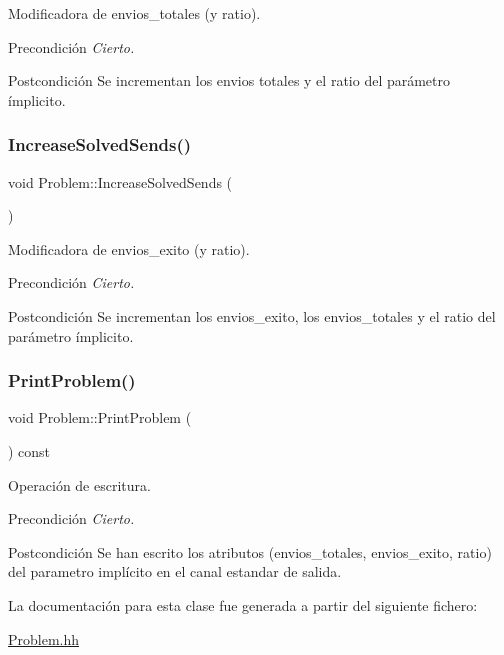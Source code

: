 Modificadora de envios\+\_\+totales (y ratio). 

\begin{DoxyPrecond}{Precondición}
{\itshape Cierto.} 
\end{DoxyPrecond}
\begin{DoxyPostcond}{Postcondición}
Se incrementan los envios totales y el ratio del parámetro ímplicito. 
\end{DoxyPostcond}
\mbox{\label{class_problem_ada706600dfd8d1f49096a23f8d22db33}} 
\subsubsection{\texorpdfstring{Increase\+Solved\+Sends()}{IncreaseSolvedSends()}}
{\footnotesize\ttfamily void Problem\+::\+Increase\+Solved\+Sends (\begin{DoxyParamCaption}{ }\end{DoxyParamCaption})}



Modificadora de envios\+\_\+exito (y ratio). 

\begin{DoxyPrecond}{Precondición}
{\itshape Cierto.} 
\end{DoxyPrecond}
\begin{DoxyPostcond}{Postcondición}
Se incrementan los envios\+\_\+exito, los envios\+\_\+totales y el ratio del parámetro ímplicito. 
\end{DoxyPostcond}
\mbox{\label{class_problem_a17e3ab7cc42f4f8c814fe5e8e08e3e9d}} 
\subsubsection{\texorpdfstring{Print\+Problem()}{PrintProblem()}}
{\footnotesize\ttfamily void Problem\+::\+Print\+Problem (\begin{DoxyParamCaption}{ }\end{DoxyParamCaption}) const}



Operación de escritura. 

\begin{DoxyPrecond}{Precondición}
{\itshape Cierto.} 
\end{DoxyPrecond}
\begin{DoxyPostcond}{Postcondición}
Se han escrito los atributos (envios\+\_\+totales, envios\+\_\+exito, ratio) del parametro implícito en el canal estandar de salida. 
\end{DoxyPostcond}


La documentación para esta clase fue generada a partir del siguiente fichero\+:\begin{DoxyCompactItemize}
\item 
\mbox{\hyperlink{_problem_8hh}{Problem.\+hh}}\end{DoxyCompactItemize}
